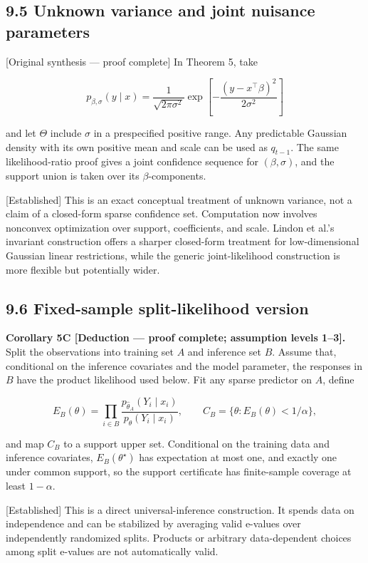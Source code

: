 \documentclass[
  english,
  11pt,
  a4paper,
]{article}
\begin{document}
\subsection{9.5 Unknown variance and joint nuisance
parameters}\label{unknown-variance-and-joint-nuisance-parameters}

{[}Original synthesis --- proof complete{]} In Theorem 5, take

$$
p_{\beta,\sigma}(y\mid x)
=
\frac{1}{\sqrt{2\pi\sigma^2}}
\exp\left[-\frac{(y-x^\top\beta)^2}{2\sigma^2}\right]
$$

and let $\Theta$ include $\sigma$ in a prespecified positive range.
Any predictable Gaussian density with its own positive mean and scale
can be used as $q_{t-1}$. The same likelihood-ratio proof gives a
joint confidence sequence for $(\beta,\sigma)$, and the support union
is taken over its $\beta$-components.

{[}Established{]} This is an exact conceptual treatment of unknown
variance, not a claim of a closed-form sparse confidence set.
Computation now involves nonconvex optimization over support,
coefficients, and scale. Lindon et al.'s invariant construction offers a
sharper closed-form treatment for low-dimensional Gaussian linear
restrictions, while the generic joint-likelihood construction is more
flexible but potentially wider.

\subsection{9.6 Fixed-sample split-likelihood
version}\label{fixed-sample-split-likelihood-version}

\textbf{Corollary 5C {[}Deduction --- proof complete; assumption levels
1--3{]}.} Split the observations into training set $A$ and inference
set $B$. Assume that, conditional on the inference covariates and the
model parameter, the responses in $B$ have the product likelihood used
below. Fit any sparse predictor on $A$, define

$$
E_B(\theta)=
\prod_{i\in B}
\frac{p_{\widehat\theta_A}(Y_i\mid x_i)}
     {p_\theta(Y_i\mid x_i)},
\qquad
C_B=\{\theta:E_B(\theta)<1/\alpha\},
$$

and map $C_B$ to a support upper set. Conditional on the training data
and inference covariates, $E_B(\theta^\star)$ has expectation at most
one, and exactly one under common support, so the support certificate
has finite-sample coverage at least $1-\alpha$.

{[}Established{]} This is a direct universal-inference construction. It
spends data on independence and can be stabilized by averaging valid
e-values over independently randomized splits. Products or arbitrary
data-dependent choices among split e-values are not automatically valid.
\end{document}
